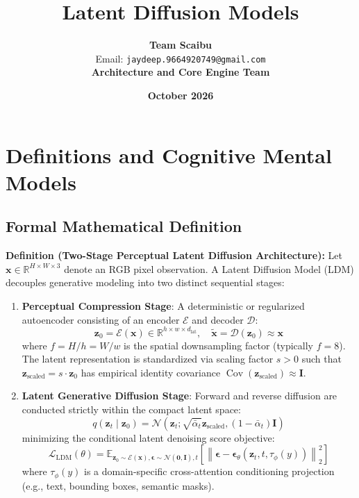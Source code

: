 \documentclass[11pt,a4paper]{article}
\title{\textbf{Latent Diffusion Models}}
\author{\textbf{Team Scaibu} \\ \small Email: \texttt{jaydeep.9664920749@gmail.com} \\ \small \textbf{Architecture and Core Engine Team}}
\date{\textbf{October 2026}}
\theoremstyle{definition}
\begin{document}
\maketitle

\section{Definitions and Cognitive Mental Models}

\subsection{Formal Mathematical Definition}
\textbf{Definition (Two-Stage Perceptual Latent Diffusion Architecture):}
Let $\mathbf{x} \in \mathbb{R}^{H \times W \times 3}$ denote an RGB pixel observation. A Latent Diffusion Model (LDM) decouples generative modeling into two distinct sequential stages:
\begin{enumerate}
    \item \textbf{Perceptual Compression Stage}: A deterministic or regularized autoencoder consisting of an encoder $\mathcal{E}$ and decoder $\mathcal{D}$:
    {\boldmath
    \begin{equation}
    \mathbf{z}_0 = \mathcal{E}(\mathbf{x}) \in \mathbb{R}^{h \times w \times d_{\text{lat}}}, \quad \tilde{\mathbf{x}} = \mathcal{D}(\mathbf{z}_0) \approx \mathbf{x}
    \end{equation}
    }
    where $f = H / h = W / w$ is the spatial downsampling factor (typically $f = 8$). The latent representation is standardized via scaling factor $s > 0$ such that $\mathbf{z}_{\text{scaled}} = s \cdot \mathbf{z}_0$ has empirical identity covariance $\operatorname{Cov}(\mathbf{z}_{\text{scaled}}) \approx \mathbf{I}$.
    \item \textbf{Latent Generative Diffusion Stage}: Forward and reverse diffusion are conducted strictly within the compact latent space:
    {\boldmath
    \begin{equation}
    q(\mathbf{z}_t \mid \mathbf{z}_0) = \mathcal{N}\left(\mathbf{z}_t; \sqrt{\bar{\alpha}_t} \mathbf{z}_{\text{scaled}}, (1 - \bar{\alpha}_t)\mathbf{I}\right)
    \end{equation}
    }
    minimizing the conditional latent denoising score objective:
    {\boldmath
    \begin{equation}
    \mathcal{L}_{\text{LDM}}(\theta) = \mathbb{E}_{\mathbf{z}_0 \sim \mathcal{E}(\mathbf{x}), \boldsymbol{\epsilon} \sim \mathcal{N}(\mathbf{0}, \mathbf{I}), t}\left[ \left\| \boldsymbol{\epsilon} - \boldsymbol{\epsilon}_\theta(\mathbf{z}_t, t, \tau_\phi(y)) \right\|_2^2 \right]
    \end{equation}
    }
    where $\tau_\phi(y)$ is a domain-specific cross-attention conditioning projection (e.g., text, bounding boxes, semantic masks).
\end{enumerate}
\end{document}
